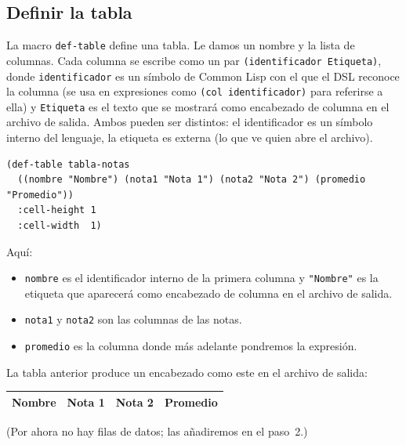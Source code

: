 \documentclass[12pt,a4paper]{report}
\begin{document}
\subsection{Definir la tabla}

La macro \texttt{def-table} define una tabla.  Le damos
un nombre y la lista de columnas.  Cada columna se escribe como un par
\texttt{(identificador \textquotedbl Etiqueta\textquotedbl)}, donde \texttt{identificador} es un
símbolo de Common Lisp con el que el DSL reconoce la columna (se usa
en expresiones como \texttt{(col identificador)} para referirse a ella)
y \texttt{\textquotedbl Etiqueta\textquotedbl} es el texto que se
mostrará como encabezado de columna en el archivo de salida.
Ambos pueden ser distintos: el identificador es un símbolo interno del
lenguaje, la etiqueta es externa (lo que ve quien abre el archivo).

\begin{lstlisting}[caption={def-table con etiquetas visibles.}]
(def-table tabla-notas
  ((nombre "Nombre") (nota1 "Nota 1") (nota2 "Nota 2") (promedio "Promedio"))
  :cell-height 1
  :cell-width  1)
\end{lstlisting}

\noindent Aquí:
\begin{itemize}
  \item \texttt{nombre} es el identificador interno de la primera
    columna y \texttt{"Nombre"} es la etiqueta que aparecerá como
    encabezado de columna en el archivo de salida.
  \item \texttt{nota1} y \texttt{nota2} son las columnas de las notas.
  \item \texttt{promedio} es la columna donde más adelante pondremos
    la expresión.
\end{itemize}

La tabla anterior produce un encabezado como este en el archivo de
salida:

\begin{center}
\begin{tabular}{|l|c|c|c|}
\toprule
\textbf{Nombre} & \textbf{Nota 1} & \textbf{Nota 2} & \textbf{Promedio} \\
\midrule
\bottomrule
\end{tabular}
\end{center}

(Por ahora no hay filas de datos; las añadiremos en el paso~2.)
\end{document}
